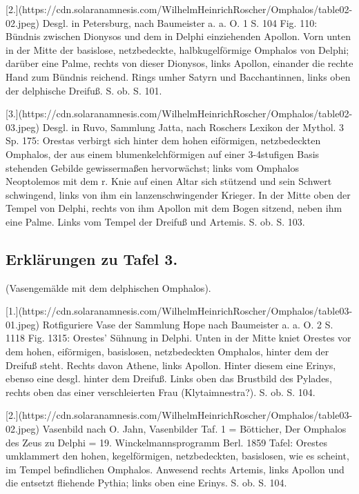 \documentclass[a4paper, 11pt, oneside]{article}
\begin{document}
[2.](https://cdn.solaranamnesis.com/WilhelmHeinrichRoscher/Omphalos/table02-02.jpeg) Desgl. in Petersburg, nach Baumeister a. a. O. 1 S. 104 Fig. 110: Bündnis zwischen Dionysos und dem in Delphi einziehenden Apollon. Vorn unten in der Mitte der basislose, netzbedeckte, halbkugelförmige Omphalos von Delphi; darüber eine Palme, rechts von dieser Dionysos, links Apollon, einander die rechte Hand zum Bündnis reichend. Rings umher Satyrn und Bacchantinnen, links oben der delphische Dreifuß. S. ob. S. 101.

[3.](https://cdn.solaranamnesis.com/WilhelmHeinrichRoscher/Omphalos/table02-03.jpeg) Desgl. in Ruvo, Sammlung Jatta, nach Roschers Lexikon der Mythol. 3 Sp. 175: Orestas verbirgt sich hinter dem hohen eiförmigen, netzbedeckten Omphalos, der aus einem blumenkelchförmigen auf einer 3-4stufigen Basis stehenden Gebilde gewissermaßen hervorwächst; links vom Omphalos Neoptolemos mit dem r. Knie auf einen Altar sich stützend und sein Schwert schwingend, links von ihm ein lanzenschwingender Krieger. In der Mitte oben der Tempel von Delphi, rechts von ihm Apollon mit dem Bogen sitzend, neben ihm eine Palme. Links vom Tempel der Dreifuß und Artemis. S. ob. S. 103.
\clearpage
\subsection{Erklärungen zu Tafel 3.}

(Vasengemälde mit dem delphischen Omphalos).

[1.](https://cdn.solaranamnesis.com/WilhelmHeinrichRoscher/Omphalos/table03-01.jpeg) Rotfiguriere Vase der Sammlung Hope nach Baumeister a. a. O. 2 S. 1118 Fig. 1315: Orestes' Sühnung in Delphi. Unten in der Mitte kniet Orestes vor dem hohen, eiförmigen, basislosen, netzbedeckten Omphalos, hinter dem der Dreifuß steht. Rechts davon Athene, links Apollon. Hinter diesem eine Erinys, ebenso eine desgl. hinter dem Dreifuß. Links oben das Brustbild des Pylades, rechts oben das einer verschleierten Frau (Klytaimnestra?). S. ob. S. 104.

[2.](https://cdn.solaranamnesis.com/WilhelmHeinrichRoscher/Omphalos/table03-02.jpeg) Vasenbild nach O. Jahn, Vasenbilder Taf. 1 = Bötticher, Der Omphalos des Zeus zu Delphi = 19. Winckelmannsprogramm Berl. 1859 Tafel: Orestes umklammert den hohen, kegelförmigen, netzbedeckten, basislosen, wie es scheint, im Tempel befindlichen Omphalos. Anwesend rechts Artemis, links Apollon und die entsetzt fliehende Pythia; links oben eine Erinys. S. ob. S. 104.
\end{document}
